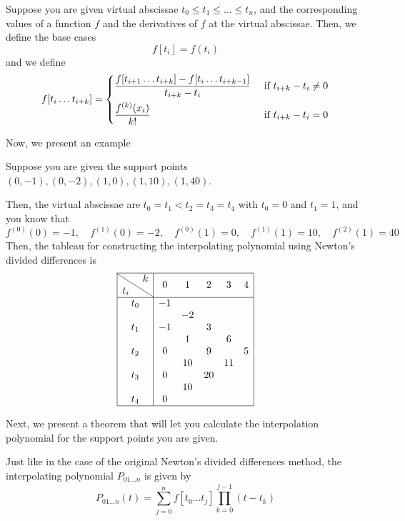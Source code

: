\begin{defn}
  Suppose you are given virtual abscissae $t_0 \leq t_1 \leq \dots \leq t_n$, and the corresponding values of a function $f$ and the derivatives of $f$ at the virtual abscissae. Then, we define the base cases
  \[
    f[t_i] = f(t_i)
  \]
  and we define
  \[
    f[t_i\dots t_{i+k}]
    =
    \begin{dcases}
      \frac{f[t_{i+1}\dots t_{i+k}] - f[t_{i}\dots t_{i+k-1}]}{t_{i+k} - t_{i}}
      & \text{ if } t_{i+k} - t_{i} \neq 0 \\
      \frac{f^{(k)}(x_i)}{k!}
      & \text{ if } t_{i+k} - t_{i} = 0 \\
    \end{dcases}
  \]
\end{defn}
Now, we present an example
\begin{example}
  Suppose you are given the support points $(0, -1), (0, -2), (1, 0), (1, 10), (1, 40)$.

  Then, the virtual abscissae are $t_0 = t_1 < t_2 = t_3 = t_4$ with $t_0 = 0$ and $t_1 = 1$, and you know that
  \[
    f^{(0)}(0) = -1, \quad
    f^{(1)}(0) = -2, \quad
    f^{(0)}(1) = 0, \quad
    f^{(1)}(1) = 10, \quad
    f^{(2)}(1) = 40
  \]
  Then, the tableau for constructing the interpolating polynomial using Newton's divided differences is
  \[
    \begin{array}{|c| c c c c c|}
      \hline
      \hbox{\diagbox{$t_i$}{$k$}} & 0 & 1  & 2  & 3 & 4 \\
      \hline
      t_0 & -1 &    &    &    &    \\
          &    & -2 &    &    &    \\
      t_1 & -1 &    & 3  &    &    \\
          &    & 1  &    & 6  &    \\
      t_2 & 0  &    & 9  &    & 5  \\
          &    & 10 &    & 11 &    \\
      t_3 & 0  &    & 20 &    &    \\
          &    & 10 &    &    &    \\
      t_4 & 0  &    &    &    &    \\
      \hline
    \end{array}
  \]
\end{example}
Next, we present a theorem that will let you calculate the interpolation polynomial for the support points you are given.
\begin{thm}
  Just like in the case of the original Newton's divided differences method, the interpolating polynomial $P_{01\dots n}$ is given by
  \[
    P_{01\dots n}(t) = \sum_{j = 0}^n f[t_{0}\dots t_{j}] \prod_{k = 0}^{j-1}\left(t - t_{k} \right)
  \]
\end{thm}
